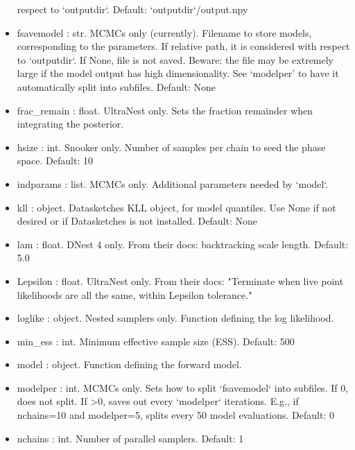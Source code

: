 \documentclass[letterpaper, 12pt]{article}
\begin{document}
\begin{itemize}
                            respect to `outputdir`.   
                            Default: `outputdir`/output.npy
\item fsavemodel : str. MCMCs only (currently). 
                        Filename to store models, corresponding to  
                        the parameters. If relative path, it is  
                        considered with respect to `outputdir`.   
                        If None, file is not saved.   
                        Beware: the file may be extremely large  
                        if the model output has high dimensionality. 
                        See `modelper' to have it automatically split into 
                        subfiles.
                        Default: None
\item frac\_remain : float. UltraNest only. Sets the fraction  
                            remainder when integrating the posterior.
\item hsize : int. Snooker only. Number of samples per chain to seed the 
                   phase space.  Default: 10
\item indparams : list. MCMCs only. Additional parameters needed by `model`.
\item kll : object.  Datasketches KLL object, for model quantiles.  
                     Use None if not desired or if Datasketches is  
                     not installed.  Default: None
\item lam : float. DNest 4 only. From their docs: backtracking scale 
                   length.  Default: 5.0
\item Lepsilon : float. UltraNest only. From their docs: "Terminate  
                        when live point likelihoods are all the same,  
                        within Lepsilon tolerance."
\item loglike : object. Nested samplers only.  Function defining the log 
                        likelihood.
\item min\_ess : int. Minimum effective sample size (ESS). Default: 500
\item model : object. Function defining the forward model.
\item modelper : int. MCMCs only. Sets how to split `fsavemodel` 
                      into subfiles.   
                      If 0, does not split.  If >0, saves out every  
                      `modelper` iterations.  E.g., if nchains=10 and  
                      modelper=5, splits every 50 model evaluations.   
                      Default: 0
\item nchains : int. Number of parallel samplers. Default: 1

\end{itemize}
\end{document}
